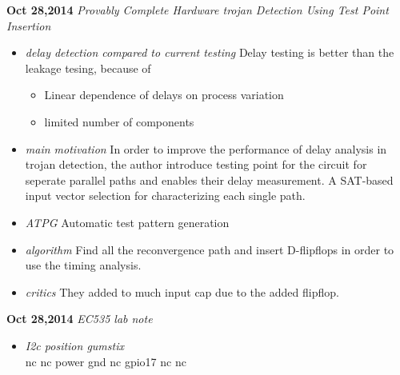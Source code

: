 \documentclass[]{article}
\begin{document}
\noindent \textbf{Oct 28,2014}
\textit{Provably Complete Hardware trojan Detection Using Test Point Insertion}
\indent		\begin{itemize}
            \item \textit{delay detection compared to current testing} Delay
            testing is better than the leakage tesing, because of 
                \begin{itemize}
                    \item Linear dependence of delays on process variation
                    \item limited number of components
                \end{itemize}
            \item \textit{main motivation} In order to improve the performance
            of delay analysis in trojan detection, the author introduce testing
            point for the circuit for seperate parallel paths and enables their
            delay measurement.  A SAT-based input vector selection for
            characterizing each single path.
            \item \textit{ATPG} Automatic test pattern generation
            \item \textit{algorithm} Find all the reconvergence path and insert
            D-flipflops in order to use the timing analysis.
            \item \textit{critics} They added to much input cap due to the
            added flipflop.
       		\end{itemize}

\noindent \textbf{Oct 28,2014}
\textit{EC535 lab note}
\indent		\begin{itemize}
                \item \textit{I2c position gumstix} \\
                nc nc power gnd
                nc gpio17 nc nc
       		\end{itemize}
\end{document}
